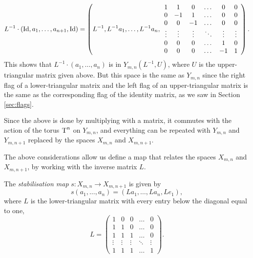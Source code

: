 \[ L^{-1}\cdot \left(\operatorname{Id},a_1,\dots,a_{n+1},\operatorname{Id}\right) =
\left(L^{-1},L^{-1}a_1,\dots,L^{-1}a_{n},
  \begin{array}{cccccc}
    1 &  1 &  0 & \dots &  0 & 0 \\
    0 & -1 &  1 & \dots &  0 & 0 \\
    0 &  0 & -1 & \dots &  0 & 0 \\
    \vdots & \vdots & \vdots & \ddots & \vdots & \vdots \\
    0 &  0 & 0 & \dots &  1 & 0 \\
    0 &  0 & 0 & \dots & -1 & 1
  \end{array}
\right). \]
This shows that $L^{-1}\cdot(a_1,\dots,a_{n})$ is in
$Y_{m,n}(L^{-1},U)$, where $U$ is the
upper-triangular matrix given above. But this space is the same as
$Y_{m,n}$ since the right flag of a lower-triangular matrix and the
left flag of an upper-triangular matrix
is the same as the corresponding flag of the identity
matrix, as we saw in Section \ref{sec:flags}.

Since the above is done by multiplying with a matrix, it commutes with
the action of the torus $\operatorname{T}^n$ on $Y_{m,n}$, and everything can be
repeated with $Y_{m,n}$ and $Y_{m,n+1}$ replaced by the spaces
$X_{m,n}$ and $X_{m,n+1}$.

The above considerations allow us define a map that relates the spaces
$X_{m,n}$ and $X_{m,n+1}$, by working with the inverse matrix $L$.
\begin{definition}
  \label{def:stabilisering}
  The \textit{stabilisation map} $s : X_{m,n} \to X_{m,n+1}$ is given
  by
  \[ s\left(a_1,\dots,a_{n}\right) =
  \left(La_1,\dots,La_{n},Le_1\right), \]
  where $L$ is the lower-triangular matrix with every entry below the
  diagonal equal to one,
  \[ L =
  \begin{pmatrix}
    1 & 0 & 0 & \dots & 0 \\
    1 & 1 & 0 & \dots & 0 \\
    1 & 1 & 1 & \dots & 0 \\
    \vdots & \vdots & \vdots & \ddots & \vdots \\
    1 & 1 & 1 & \dots & 1
  \end{pmatrix}. \]
\end{definition}

